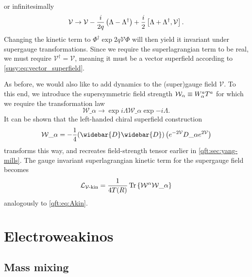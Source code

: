 \documentclass[../main.tex]{subfiles}
\begin{document}
or infinitesimally
\begin{equation}
  \mathcal{V} \to \mathcal{V} - \frac{i}{2q} \left(\Lambda - \Lambda^\dagger\right) + \frac{i}{2} \left[\Lambda + \Lambda^\dagger,\mathcal{V}\right].
\end{equation}
Changing the kinetic term to \(\Phi^\dagger \exp{2q\mathcal{V}} \Phi\) will then yield it invariant under supergauge transformations.
Since we require the superlagrangian term to be real, we must require \(\mathcal{V}^\dagger = \mathcal{V}\), meaning it must be a vector superfield according to \cref{susy:eq:vector_superfield}.

As before, we would also like to add dynamics to the (super)gauge field \(\mathcal{V}\).
To this end, we introduce the supersymmetric field strength \(\mathcal{W}_\alpha \equiv W\indices*{^a_\alpha} T^a\) for which we require the transformation law
\begin{equation}
  \mathcal{W}\_\alpha \to \exp{i\Lambda} \mathcal{W}\_\alpha \exp{-i\Lambda}.
\end{equation}
It can be shown that the left-handed chiral superfield construction
\begin{equation}
  \label{susy:eq:superfield_strength}
  \mathcal{W}\_\alpha = -\frac{1}{4} (\widebar{D}\widebar{D}) \pclosed{\exp{-2\mathcal{V}} D\_\alpha \exp{2\mathcal{V}}}
\end{equation}
transforms this way, and recreates field-strength tensor earlier in \cref{qft:sec:yang-mills}.\cite{Martin:1997ns}
The gauge invariant superlagrangian kinetic term for the supergauge field becomes
\begin{equation}
  \label{susy:eq:Vkin}
  \L_{\mathcal{V}\text{-kin}} = \frac{1}{4 T(R)} \tr\cclosed{ \mathcal{W}\^\alpha \mathcal{W}\_\alpha }
\end{equation}
analogously to \cref{qft:eq:Akin}.
\\





\section{Electroweakinos}
\subsection{Mass mixing}
\end{document}
